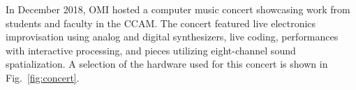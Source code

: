 In December 2018, OMI hosted a computer music concert showcasing work from students and faculty in the CCAM. The concert featured live electronics improvisation using analog and digital synthesizers, live coding, performances with interactive processing, and pieces utilizing eight-channel sound spatialization. A selection of the hardware used for this concert is shown in Fig.~\ref{fig:concert}.

